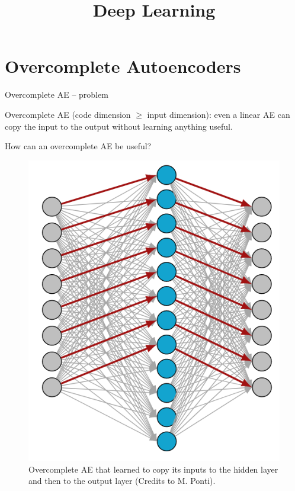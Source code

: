 




\title{Deep Learning}
\date{}


\newcommand{\titlefigure}{plots/denoising_autoencoder.png}
\newcommand{\learninggoals}{
  \item Overcomplete AEs
  \item Sparse AEs
  \item Denoising AEs
  \item Contractive AEs
}





\section{Overcomplete Autoencoders}


\begin{vbframe}{Overcomplete AE -- problem}

  Overcomplete AE (code dimension $\geq$ input dimension): even a linear AE can copy the input to the output without learning anything useful.

  \vspace{0.2cm}

  How can an overcomplete AE be useful?
 
 \vspace*{-0.3cm}
\begin{figure}[h]
    \centering
    \includegraphics[width=0.35\linewidth]{plots/AE_overcomplete2.png}
    \caption{Overcomplete AE that learned to copy its inputs to the hidden layer and then to the output layer (Credits to M. Ponti).} 
\end{figure}
    
    
\end{vbframe}


